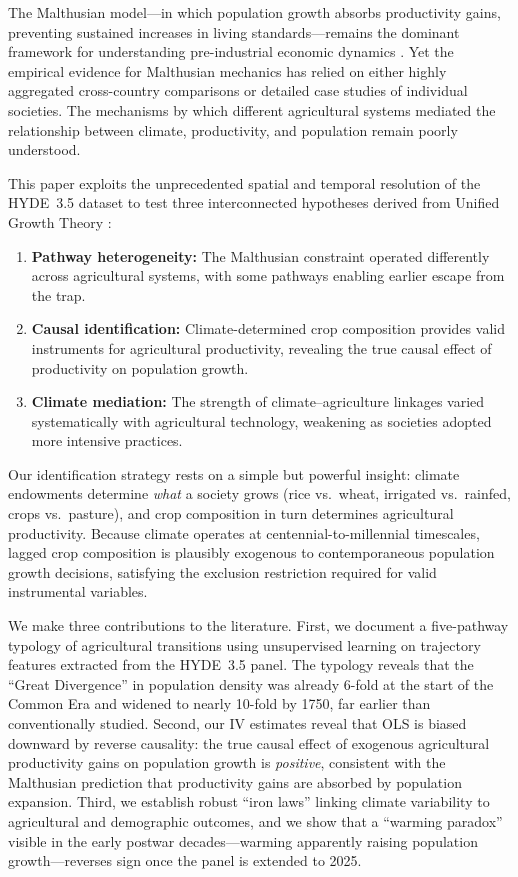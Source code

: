 \documentclass[12pt,letterpaper]{article}
\begin{document}
The Malthusian model---in which population growth absorbs productivity gains, preventing sustained increases in living standards---remains the dominant framework for understanding pre-industrial economic dynamics \citep{galor2011unified, ashraf2011dynamics}. Yet the empirical evidence for Malthusian mechanics has relied on either highly aggregated cross-country comparisons or detailed case studies of individual societies. The mechanisms by which different agricultural systems mediated the relationship between climate, productivity, and population remain poorly understood.

This paper exploits the unprecedented spatial and temporal resolution of the HYDE~3.5 dataset \citep{goldewijk2017} to test three interconnected hypotheses derived from Unified Growth Theory \citep{galor2011unified}:

\begin{enumerate}[label=(\roman*)]
  \item \textbf{Pathway heterogeneity:} The Malthusian constraint operated differently across agricultural systems, with some pathways enabling earlier escape from the trap.
  \item \textbf{Causal identification:} Climate-determined crop composition provides valid instruments for agricultural productivity, revealing the true causal effect of productivity on population growth.
  \item \textbf{Climate mediation:} The strength of climate--agriculture linkages varied systematically with agricultural technology, weakening as societies adopted more intensive practices.
\end{enumerate}

Our identification strategy rests on a simple but powerful insight: climate endowments determine \textit{what} a society grows (rice vs.\ wheat, irrigated vs.\ rainfed, crops vs.\ pasture), and crop composition in turn determines agricultural productivity. Because climate operates at centennial-to-millennial timescales, lagged crop composition is plausibly exogenous to contemporaneous population growth decisions, satisfying the exclusion restriction required for valid instrumental variables.

We make three contributions to the literature. First, we document a five-pathway typology of agricultural transitions using unsupervised learning on trajectory features extracted from the HYDE~3.5 panel. The typology reveals that the ``Great Divergence'' in population density was already 6-fold at the start of the Common Era and widened to nearly 10-fold by 1750, far earlier than conventionally studied. Second, our IV estimates reveal that OLS is biased downward by reverse causality: the true causal effect of exogenous agricultural productivity gains on population growth is \textit{positive}, consistent with the Malthusian prediction that productivity gains are absorbed by population expansion. Third, we establish robust ``iron laws'' linking climate variability to agricultural and demographic outcomes, and we show that a ``warming paradox'' visible in the early postwar decades---warming apparently raising population growth---reverses sign once the panel is extended to 2025.
\end{document}

